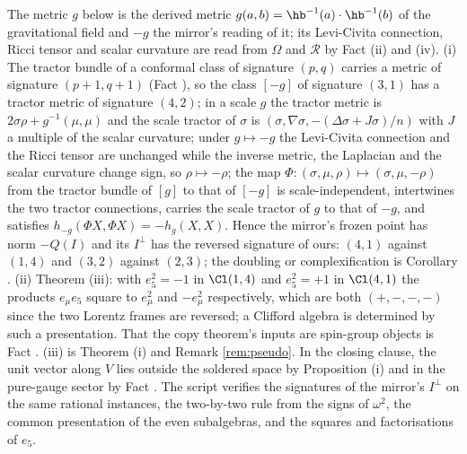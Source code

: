 The metric $g$ below is the derived metric $g(a,b) = \hb^{-1}(a) \cdot \hb^{-1}(b)$ of the gravitational field and $-g$ the mirror's reading of it; its Levi-Civita connection, Ricci tensor and scalar curvature are read from $\Omega$ and $\mathcal{R}$ by Fact (ii) and (iv). (i) The tractor bundle of a conformal class of signature $(p,q)$ carries a metric of signature $(p+1,q+1)$ (Fact ), so the class $[-g]$ of signature $(3,1)$ has a tractor metric of signature $(4,2)$; in a scale $g$ the tractor metric is $2\sigma\rho + g^{-1}(\mu,\mu)$ and the scale tractor of $\sigma$ is $(\sigma, \nabla\sigma, -(\Delta\sigma + J\sigma)/n)$ with $J$ a multiple of the scalar curvature; under $g \mapsto -g$ the Levi-Civita connection and the Ricci tensor are unchanged while the inverse metric, the Laplacian and the scalar curvature change sign, so $\rho \mapsto -\rho$; the map $\Phi: (\sigma, \mu, \rho) \mapsto (\sigma, \mu, -\rho)$ from the tractor bundle of $[g]$ to that of $[-g]$ is scale-independent, intertwines the two tractor connections, carries the scale tractor of $g$ to that of $-g$, and satisfies $h_{-g}(\Phi X, \Phi X) = -h_{g}(X, X)$. Hence the mirror's frozen point has norm $-Q(I)$ and its $I^{\perp}$ has the reversed signature of ours: $(4,1)$ against $(1,4)$ and $(3,2)$ against $(2,3)$; the doubling or complexification is Corollary . (ii) Theorem (iii): with $e_{5}^{2} = -1$ in $\Cl(1,4)$ and $e_{5}^{2} = +1$ in $\Cl(4,1)$ the products $e_{\mu}e_{5}$ square to $e_{\mu}^{2}$ and $-e_{\mu}^{2}$ respectively, which are both $(+,-,-,-)$ since the two Lorentz frames are reversed; a Clifford algebra is determined by such a presentation. That the copy theorem's inputs are spin-group objects is Fact . (iii) is Theorem (i) and Remark \ref{rem:pseudo}. In the closing clause, the unit vector along $V$ lies outside the soldered space by Proposition (i) and in the pure-gauge sector by Fact . The script verifies the signatures of the mirror's $I^{\perp}$ on the same rational instances, the two-by-two rule from the signs of $\omega^{2}$, the common presentation of the even subalgebras, and the squares and factorisations of $e_{5}$.
